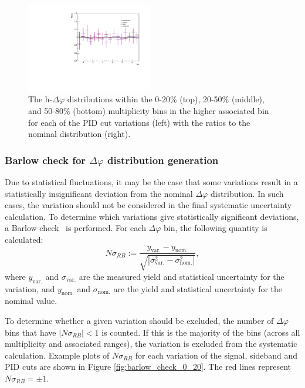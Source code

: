 \begin{figure}[ht]
    \includegraphics[width=0.49\textwidth]{figures/analysis/pid_variations_dphi_50_80_highpt_ratio.pdf}
    \caption{The h-\lmb $\Delta\varphi$ distributions within the 0-20\% (top), 20-50\% (middle), and 50-80\% (bottom) multiplicity bins in the higher associated \pt bin for each of the PID cut variations (left) with the ratios to the nominal distribution (right).}
    \label{fig:pid_cut_variations_highpt}
\end{figure}

\clearpage

\subsubsection{Barlow check for $\Delta\varphi$ distribution generation}
\label{sec:barlow_check_dphi}

Due to statistical fluctuations, it may be the case that some variations result in a statistically insignificant deviation from the nominal $\Delta\varphi$ distribution. In such cases, the variation should not be considered in the final systematic uncertainty calculation. To determine which variations give statistically significant deviations, a Barlow check~\cite{BarlowCheck} is performed. For each $\Delta\varphi$ bin, the following quantity is calculated:
%
\begin{equation}
    \label{eq:barlow_check}
	N\sigma_{RB} := \frac{y_{\text{var.}} - y_{\text{nom.}}}{\sqrt{|\sigma_{\text{var.}}^2 - \sigma_{\text{nom.}}^2|}},
\end{equation}
%
where $y_{\text{var.}}$ and $\sigma_{\text{var.}}$ are the measured yield and statistical uncertainty for the variation, and $y_{\text{nom.}}$ and $\sigma_{\text{nom.}}$ are the yield and statistical uncertainty for the nominal value. 

To determine whether a given variation should be excluded, the number of $\Delta\varphi$ bins that have $|N\sigma_{RB}| < 1$ is counted. If this is the majority of the bins (across all multiplicity and associated \pt ranges), the variation is excluded from the systematic calculation. Example plots of $N\sigma_{RB}$ for each variation of the signal, sideband and PID cuts are shown in Figure \ref{fig:barlow_check_0_20}. The red lines represent $N\sigma_{RB} = \pm 1$.

